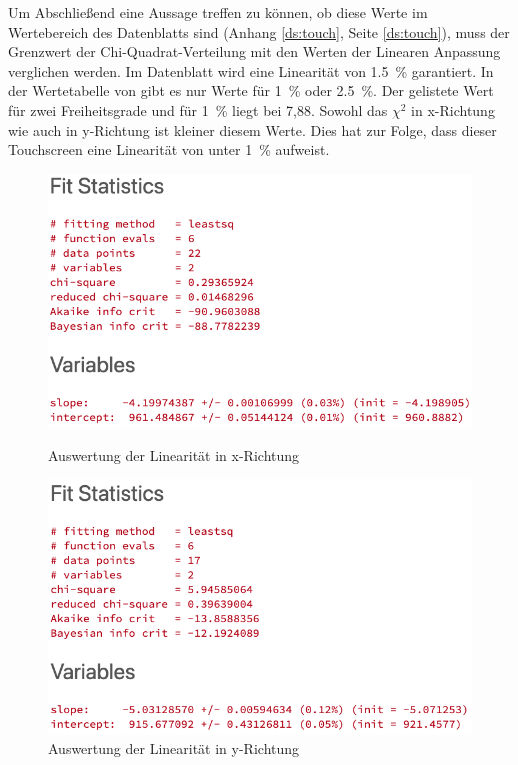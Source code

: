 Um Abschließend eine Aussage treffen zu können, ob diese Werte im Wertebereich des Datenblatts sind (Anhang \cref{ds:touch}, Seite \cref{ds:touch}), muss der Grenzwert der Chi-Quadrat-Verteilung mit den Werten der Linearen Anpassung verglichen werden.
Im Datenblatt wird eine Linearität von \SI{1,5}{\%} garantiert.
In der Wertetabelle von \cite{papula} gibt es nur Werte für \SI{1}{\%} oder \SI{2,5}{\%}.
Der gelistete Wert für zwei Freiheitsgrade und für \SI{1}{\%} liegt bei 7,88.
Sowohl das \(\chi^2\) in x-Richtung wie auch in y-Richtung ist kleiner diesem Werte.
Dies hat zur Folge, dass dieser Touchscreen eine Linearität von unter \SI{1}{\%} aufweist.
\begin{figure}
    \begin{minipage}{0.49\linewidth}
        \centering
        \includegraphics[width=\linewidth]{fig/xfit.png}
        \caption{Auswertung der Linearität in x-Richtung}
        \label{fig:xfit}
    \end{minipage}
    \begin{minipage}{0.49\linewidth}
        \centering
        \includegraphics[width=\linewidth]{fig/yfit.png}
        \caption{Auswertung der Linearität in y-Richtung}
        \label{fig:yfit}
    \end{minipage}
\end{figure} 
